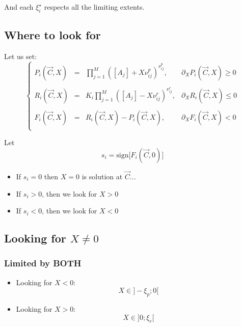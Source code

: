 \documentclass[aps,12pt]{revtex4}
\begin{document}
And each $\xi_i^\star$ respects all the limiting extents.

\subsection{Where to look for}
Let us set:
\begin{equation}
\left\lbrace
\begin{array}{rcll}
	P_i(\vec{C},X) & = & \displaystyle \prod_{j=1}^{M} \left([A_j] + X \nu^p_{ij} \right)^{\nu^p_{ij}}, & \partial_X P_i(\vec{C},X) \geq 0 \\
	\\
	R_i(\vec{C},X) & = & \displaystyle K_i \prod_{j=1}^{M} \left([A_j] - X \nu^r_{ij}\right)^{\nu^r_{ij}}, & \partial_X R_i(\vec{C},X) \leq 0 \\
	\\
	 F_i(\vec{C},X) & = & R_i(\vec{C},X)  - P_i(\vec{C},X), & \partial_X F_i(\vec{C},X) < 0\\
\end{array}
\right.
\end{equation}

Let
\begin{equation}
	s_i = \mathrm{sign}\lbrack F_i(\vec{C},0) \rbrack
\end{equation}

\begin{itemize}
\item If $s_i=0$ then $X=0$ is solution at $\vec{C}$...

\item If $s_i>0$, then we look for $X>0$

\item If $s_i<0$, then we look for $X<0$

\end{itemize}

\subsection{Looking for $X\not=0$}
	
\subsubsection{Limited by BOTH}

\begin{itemize}
\item Looking for $X<0$:
$$
X \in \rbrack -\xi_p; 0 \lbrack
$$
\item Looking for $X>0$:
$$
X \in \rbrack 0; \xi_r \lbrack
$$
\end{itemize}
\end{document}
